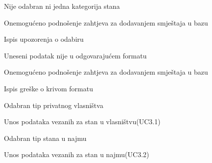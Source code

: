 \begin{packed_item}
\begin{packed_item}
							\item[3.a] Nije odabran ni jedna kategorija stana
							\item[] \begin{packed_enum}
								
								\item Onemogućeno podnošenje zahtjeva za dodavanjem smještaja u bazu
								\item Ispis upozorenja o odabiru
								
							\end{packed_enum}
							
							\item[4.a] Uneseni podatak nije u odgovarajućem formatu
							\item[] \begin{packed_enum}
								
								\item Onemogućeno podnošenje zahtjeva za dodavanjem smještaja u bazu
								\item Ispis greške o krivom formatu
								
							\end{packed_enum}
							
							\item[7.a] Odabran tip privatnog vlasništva
							\item[] \begin{packed_enum}
								
								\item Unos podataka vezanih za stan u vlasništvu(UC3.1)
								
							\end{packed_enum}
							
							\item[7.b] Odabran tip stana u najmu
							\item[] \begin{packed_enum}
								
								\item Unos podataka vezanih za stan u najmu(UC3.2)
								
							\end{packed_enum}
							
						\end{packed_item}
					\end{packed_item}
					
